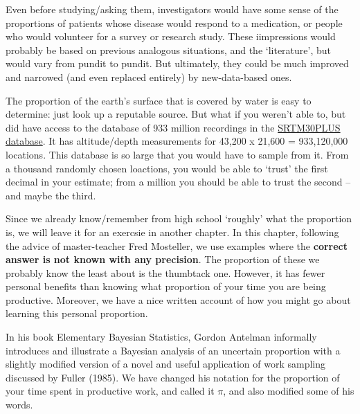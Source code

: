 \documentclass[]{book}
\begin{document}
Even before studying/asking them, investigators would have some sense of the proportions of patients whose disease would respond to a medication, or people who would volunteer for a survey or research study. These iimpressions would probably be based on previous analogous situations, and the `literature', but would vary from pundit to pundit. But ultimately, they could be much improved and narrowed (and even replaced entirely) by new-data-based ones.

The proportion of the earth's surface that is covered by water is easy to determine: just look up a reputable source. But what if you weren't able to, but did have access to the database of 933 million recordings in the \href{https://topex.ucsd.edu/cgi-bin/get_srtm30.cg}{SRTM30PLUS database}. It has altitude/depth measurements for 43,200 x 21,600 = 933,120,000 locations. This database is so large that you would have to sample from it. From a thousand randomly chosen loactions, you would be able to `trust' the first decimal in your estimate; from a million you should be able to trust the second -- and maybe the third.

Since we already know/remember from high school `roughly' what the proportion is, we will leave it for an exercsie in another chapter. In this chapter, following the advice of master-teacher Fred Mosteller, we use examples where the \textbf{correct answer is not known with any precision}. The proportion of these we probably know the least about is the thumbtack one. However, it has fewer personal benefits than knowing what proportion of your time you are being productive. Moreover, we have a nice written account of how you might go about learning this personal proportion.

In his book Elementary Bayesian Statistics, Gordon Antelman informally introduces and illustrate a Bayesian analysis of an uncertain proportion with a slightly modified version of a novel and useful application of work sampling discussed by Fuller (1985). We have changed his notation for the proportion of your time spent in productive work, and called it \(\pi\), and also modified some of his words.
\end{document}

